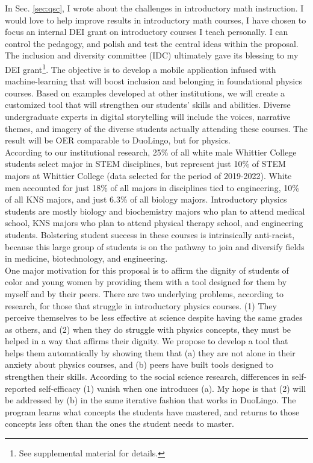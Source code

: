 \documentclass[../../../main.tex]{subfiles}
\begin{document}
\label{sec:dei}

In Sec. \ref{sec:qsc}, I wrote about the challenges in introductory math instruction.  I would love to help improve results in introductory math courses, I have chosen to focus an internal DEI grant on introductory courses I teach personally.  I can control the pedagogy, and polish and test the central ideas within the proposal.  The inclusion and diversity committee (IDC) ultimately gave its blessing to my DEI grant\footnote{See supplemental material for details.}.  The objective is to develop a mobile application infused with machine-learning that will boost inclusion and belonging in foundational physics courses.  Based on examples developed at other institutions, we will create a customized tool that will strengthen our students’ skills and abilities. Diverse undergraduate experts in digital storytelling will include the voices, narrative themes, and imagery of the diverse students actually attending these courses. The result will be OER comparable to DuoLingo, but for physics.
\\
\vspace{0.15cm}
According to our institutional research, 25\% of all white male Whittier College students select major in STEM disciplines, but represent just 10\% of STEM majors at Whittier College (data selected for the period of 2019-2022). White men accounted for just 18\% of all majors in disciplines tied to engineering, 10\% of all KNS majors, and just 6.3\% of all biology majors. Introductory physics students are mostly biology and biochemistry majors who plan to attend medical school, KNS majors who plan to attend physical therapy school, and engineering students. Bolstering student success in these courses is intrinsically anti-racist, because this large group of students is on the pathway to join and diversify fields in medicine, biotechnology, and engineering.
\\
\vspace{0.15cm}
One major motivation for this proposal is to affirm the dignity of students of color and young women by providing them with a tool designed for them by myself and by their peers. There are two underlying problems, according to research, for those that struggle in introductory physics courses. (1) They perceive themselves to be less effective at science despite having the same grades as others, and (2) when they do struggle with physics concepts, they must be helped in a way that affirms their dignity. We propose to develop a tool that helps them automatically by showing them that (a) they are not alone in their anxiety about physics courses, and (b) peers have built tools designed to strengthen their skills. According to the social science research, differences in self-reported self-efficacy (1) vanish when one introduces (a).  My hope is that (2) will be addressed by (b) in the same iterative fashion that works in DuoLingo.  The program learns what concepts the students have mastered, and returns to those concepts less often than the ones the student needs to master.
\end{document}
